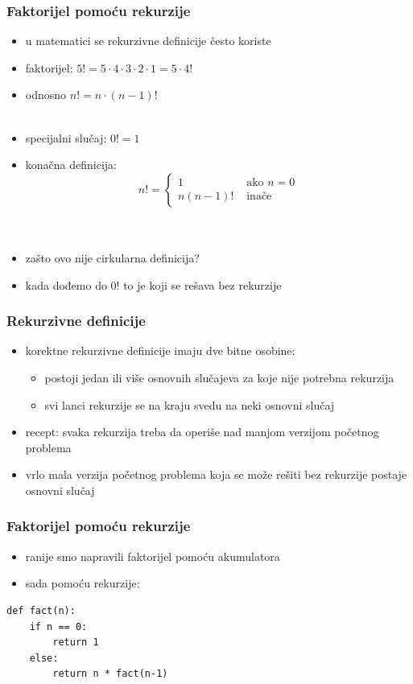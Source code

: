 \documentclass[utf8,compress,aspectratio=169]{beamer}
\begin{document}
\begin{frame}[fragile]
  \frametitle{Faktorijel pomoću rekurzije}
  \begin{itemize}
    \item u matematici se rekurzivne definicije često koriste
    \item faktorijel: $5! = 5\cdot 4\cdot 3\cdot 2\cdot 1 = 5\cdot 4!$
    \item odnosno $n! = n\cdot (n-1)!$ \\ \ \\
    \item specijalni slučaj: $0! = 1$
    \item konačna definicija: \\
    $$ n! = \left\{
      \begin{array}{rl}
        1 &\mbox{ ako $n=0$} \\
        n(n-1)! &\mbox{ ina\v{c}e}
      \end{array}
      \right. $$ \\ \ \\
    \item zašto ovo nije cirkularna definicija?
    \item kada dođemo do $0!$ to je  koji se rešava bez rekurzije
  \end{itemize}
\end{frame}

\begin{frame}[fragile]
  \frametitle{Rekurzivne definicije}
  \begin{itemize}
    \item korektne rekurzivne definicije imaju dve bitne osobine:
    \begin{itemize}
      \item postoji jedan ili više osnovnih slučajeva za koje nije potrebna rekurzija
      \item svi lanci rekurzije se na kraju svedu na neki osnovni slučaj
    \end{itemize}
    \item recept: svaka rekurzija treba da operiše nad manjom verzijom početnog problema
    \item vrlo mala verzija početnog problema koja se može rešiti bez rekurzije postaje osnovni slučaj
  \end{itemize}
\end{frame}

\begin{frame}[fragile]
  \frametitle{Faktorijel pomoću rekurzije}
  \begin{itemize}
    \item ranije smo napravili faktorijel pomoću akumulatora
    \item sada pomoću rekurzije:
  \end{itemize}
\begin{verbatim}
def fact(n):
    if n == 0:
        return 1
    else:
        return n * fact(n-1)
\end{verbatim}
\end{frame}
\end{document}
